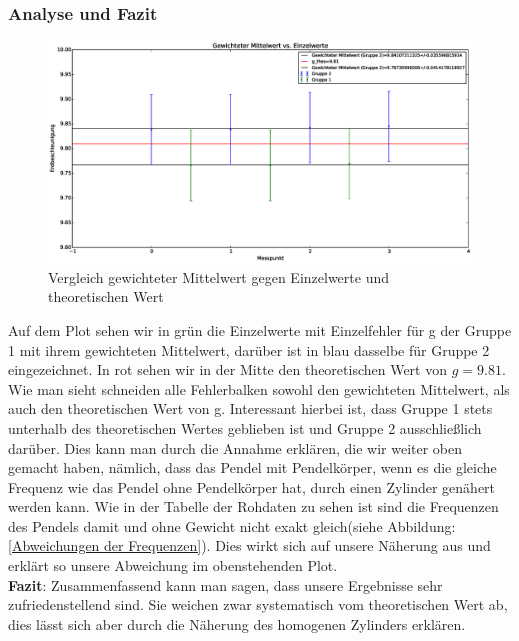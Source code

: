 \documentclass[12pt,a4paper]{article}
\begin{document}
\subsubsection{Analyse und Fazit}
\begin{figure}[H]
\caption{Vergleich gewichteter Mittelwert gegen Einzelwerte und theoretischen Wert}
\centering
\includegraphics[scale=0.4]{Bilder/Erdbeschleunigung_alle.eps}
\end{figure}
Auf dem Plot sehen wir in grün die Einzelwerte mit Einzelfehler für g der Gruppe 1 mit ihrem gewichteten Mittelwert, darüber ist in blau dasselbe für Gruppe 2 eingezeichnet. In rot sehen wir in der Mitte den theoretischen Wert von $g=9.81$.
\newline
Wie man sieht schneiden alle Fehlerbalken sowohl den gewichteten Mittelwert, als auch den theoretischen Wert von g. Interessant hierbei ist, dass Gruppe 1 stets unterhalb des theoretischen Wertes geblieben ist und Gruppe 2 ausschließlich darüber.
Dies kann man durch die Annahme erklären, die wir weiter oben gemacht haben, nämlich, dass das Pendel mit Pendelkörper, wenn es die gleiche Frequenz wie das Pendel ohne Pendelkörper hat, durch einen Zylinder genähert werden kann. 
Wie in der Tabelle der Rohdaten zu sehen ist sind die Frequenzen des Pendels damit und ohne Gewicht nicht exakt gleich(siehe Abbildung: \ref{Abweichungen der Frequenzen}). Dies wirkt sich auf unsere Näherung aus und erklärt so unsere Abweichung im obenstehenden Plot.\\

\textbf{Fazit}: \newline
Zusammenfassend kann man sagen, dass unsere Ergebnisse sehr zufriedenstellend sind. Sie weichen zwar systematisch vom theoretischen Wert ab, dies lässt sich aber durch die Näherung des homogenen Zylinders erklären.
\end{document}
